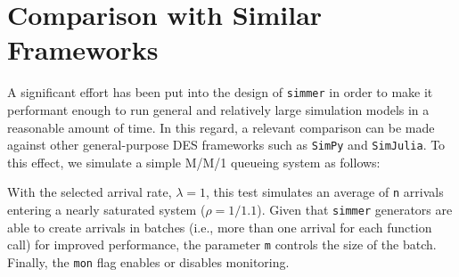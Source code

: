 \documentclass[twoside,nohyper]{tufte-book}
\newenvironment{Shaded}{}{}
\newcommand{\ControlFlowTok}[1]{\textcolor[rgb]{0.00,0.44,0.13}{\textbf{#1}}}
\newcommand{\DataTypeTok}[1]{\textcolor[rgb]{0.56,0.13,0.00}{#1}}
\newcommand{\DecValTok}[1]{\textcolor[rgb]{0.25,0.63,0.44}{#1}}
\newcommand{\FloatTok}[1]{\textcolor[rgb]{0.25,0.63,0.44}{#1}}
\newcommand{\KeywordTok}[1]{\textcolor[rgb]{0.00,0.44,0.13}{\textbf{#1}}}
\newcommand{\NormalTok}[1]{#1}
\newcommand{\OperatorTok}[1]{\textcolor[rgb]{0.40,0.40,0.40}{#1}}
\newcommand{\OtherTok}[1]{\textcolor[rgb]{0.00,0.44,0.13}{#1}}
\newcommand{\StringTok}[1]{\textcolor[rgb]{0.25,0.44,0.63}{#1}}
\theoremstyle{definition}
\theoremstyle{definition}
\theoremstyle{definition}
\theoremstyle{remark}
\begin{document}
\hypertarget{comparison-with-similar-frameworks}{%
\section{Comparison with Similar
Frameworks}\label{comparison-with-similar-frameworks}}

A significant effort has been put into the design of \texttt{simmer} in
order to make it performant enough to run general and relatively large
simulation models in a reasonable amount of time. In this regard, a
relevant comparison can be made against other general-purpose DES
frameworks such as \texttt{SimPy} and \texttt{SimJulia}. To this effect,
we simulate a simple M/M/1 queueing system as follows:

\begin{Shaded}
\end{Shaded}

With the selected arrival rate, \(\lambda=1\), this test simulates an
average of \texttt{n} arrivals entering a nearly saturated system
(\(\rho=1/1.1\)). Given that \texttt{simmer} generators are able to
create arrivals in batches (i.e., more than one arrival for each
function call) for improved performance, the parameter \texttt{m}
controls the size of the batch. Finally, the \texttt{mon} flag enables
or disables monitoring.
\end{document}
